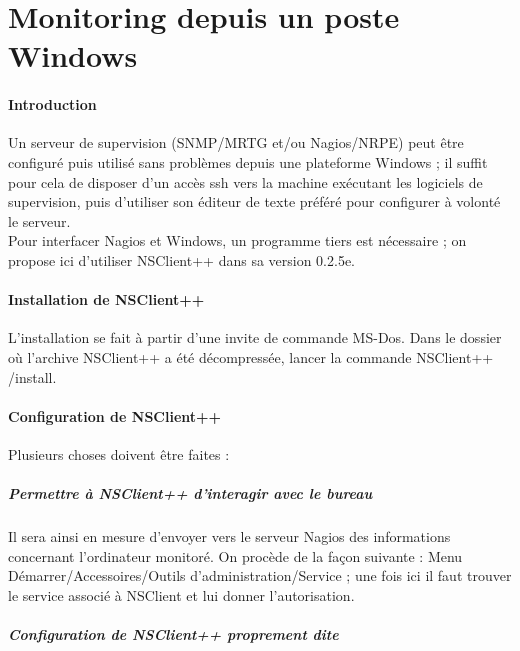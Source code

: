 \vfill \pagebreak
\part{Monitoring depuis un poste Windows}

\subsection{Introduction}
Un serveur de supervision (SNMP/MRTG et/ou Nagios/NRPE) peut être configuré
puis utilisé sans problèmes depuis une plateforme Windows ; il suffit pour
cela de disposer d'un accès ssh vers la machine exécutant les logiciels de
supervision, puis d'utiliser son éditeur de texte préféré pour configurer à
volonté le serveur.\\

Pour interfacer Nagios et Windows, un programme tiers est nécessaire ; on
propose ici d'utiliser NSClient++ dans sa version 0.2.5e.

\subsection{Installation de NSClient++}

L'installation se fait à partir d'une invite de commande MS-Dos. Dans le
dossier où l'archive NSClient++ a été décompressée, lancer la commande
NSClient++ /install.

\subsection{Configuration de NSClient++}

Plusieurs choses doivent être faites :

\subsubsection{Permettre à NSClient++ d'interagir avec le bureau}

Il sera ainsi en mesure d'envoyer vers le serveur Nagios des informations
concernant l'ordinateur monitoré.
On procède de la façon suivante : Menu Démarrer/Accessoires/Outils
d'administration/Service ; une fois ici il faut trouver le service associé
à NSClient et lui donner l'autorisation.

\subsubsection{Configuration de NSClient++ proprement dite}

